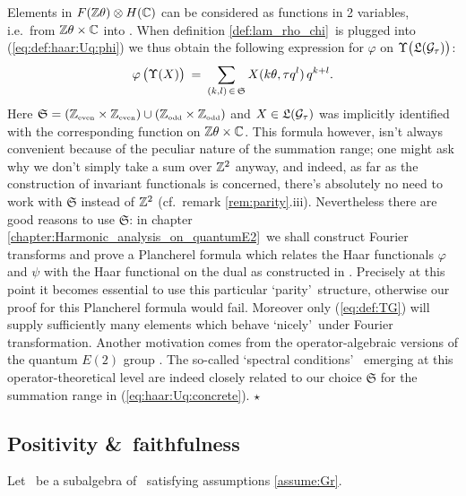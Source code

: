 \begin{remark} \label{rem:haar:Uq:concrete} \rm
Elements in $F(\mathbb{Z} \theta) \otimes H(\mathbb{C})$ can be considered as functions in
2 variables, i.e.\ from $\mathbb{Z} \theta \times \mathbb{C}$ into \CC\@.
When definition \ref{def:lam_rho_chi}\ is plugged into (\ref{eq:def:haar:Uq:phi})
we thus obtain the following expression for $\varphi$ on $\Upsilon\!\left(\TG \vertM \right)$:
\begin{equation}\label{eq:haar:Uq:concrete}
  \varphi \left(\Upsilon(X) \vertM\right)
     \:=\: \sum_{(k,l)\, \in \,\mathfrak{S}}  X(k\theta, \tau q^l)\, q^{k+l}.
\end{equation}
Here $\mathfrak{S}=(\mathbb{Z}_{\rm \scriptscriptstyle even} \times \mathbb{Z}_{\rm \scriptscriptstyle even}) \cup (\mathbb{Z}_{\rm \scriptscriptstyle odd} \times \mathbb{Z}_{\rm \scriptscriptstyle odd})$
and $X\in \mathfrak{L}(\mathcal G_\tau)$ was implicitly identified with the corresponding
function on $\mathbb{Z} \theta \times \mathbb{C}$.
This formula however, isn't always convenient because of
the peculiar nature of the summation range; one might ask why we don't simply
take a sum over $\mathbb{Z}^2$ anyway, and indeed, as far as the
construction of invariant functionals is concerned, there's
absolutely no need to work with $\mathfrak{S}$ instead of $\mathbb{Z}^2$
(cf.\ remark \ref{rem:parity}.iii).
Nevertheless there are good reasons to use $\mathfrak{S}$:
in chapter \ref{chapter:Harmonic_analysis_on_quantumE2}\ we shall construct Fourier
transforms and prove a Plancherel formula which relates the
Haar functionals $\varphi$ and $\psi$ with the Haar functional
on the dual as constructed in
\cite[see also \S\ref{par:Haar_functionals_on_Aqext}\ below]{Koelink:thesis,Koelink:QE2}\@.
Precisely at this point it becomes essential to use this particular
\lq parity\rq\ structure, otherwise our proof for this Plancherel formula would fail.
Moreover only (\ref{eq:def:TG}) will supply sufficiently many elements which
behave \lq nicely\rq\ under Fourier transformation.
Another motivation comes from the operator-algebraic versions
of the quantum $E(2)$ group \cite{FonsWor:QE2,Wor:QE2,Wor:Affiliated}\@.
The so-called \lq spectral conditions\rq\
\cite{Fons:spectral_conditions,Wor:QE2} emerging at this
operator-theoretical level are indeed closely related to our
choice $\mathfrak{S}$ for the summation range in (\ref{eq:haar:Uq:concrete}).
\hfill $\star$
\end{remark}


\subsection{Positivity \&\ faithfulness}

Let \Gtau\ be a subalgebra of \HC\ satisfying assumptions \ref{assume:Gr}\@.

